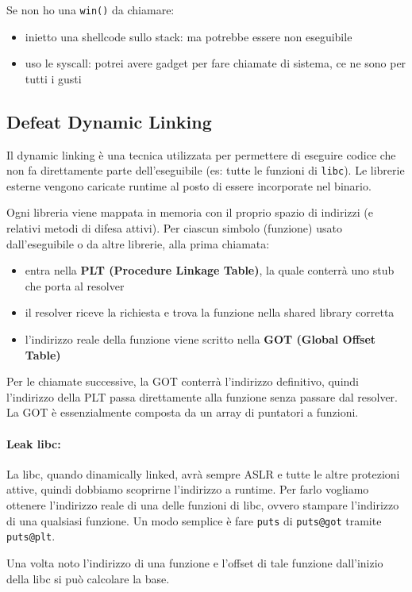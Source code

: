 Se non ho una \texttt{win()} da chiamare:
\begin{itemize}
	\item inietto una shellcode sullo stack: ma potrebbe essere non eseguibile

	\item uso le syscall: potrei avere gadget per fare chiamate di sistema, ce ne sono per tutti i gusti
\end{itemize}

\subsection{Defeat Dynamic Linking}

Il dynamic linking è una tecnica utilizzata per permettere di eseguire codice che non fa direttamente parte dell'eseguibile (es: tutte le funzioni di \texttt{libc}). Le librerie esterne vengono caricate runtime al posto di essere incorporate nel binario.

Ogni libreria viene mappata in memoria con il proprio spazio di indirizzi (e relativi metodi di difesa attivi). Per ciascun simbolo (funzione) usato dall'eseguibile o da altre librerie, alla prima chiamata:
\begin{itemize}
	\item entra nella \textbf{PLT (Procedure Linkage Table)}, la quale conterrà uno stub che porta al resolver
	
    \item il resolver riceve la richiesta e trova la funzione nella shared library corretta
	
    \item l'indirizzo reale della funzione viene scritto nella \textbf{GOT (Global Offset Table)}
\end{itemize}

Per le chiamate successive, la GOT conterrà l'indirizzo definitivo, quindi l'indirizzo della PLT passa direttamente alla funzione senza passare dal resolver. La GOT è essenzialmente composta da un array di puntatori a funzioni.

\paragraph{Leak libc:} La libc, quando dinamically linked, avrà sempre ASLR e tutte le altre protezioni attive, quindi dobbiamo scoprirne l'indirizzo a runtime. Per farlo vogliamo ottenere l'indirizzo reale di una delle funzioni di libc, ovvero stampare l'indirizzo di una qualsiasi funzione. Un modo semplice è fare \texttt{puts} di \texttt{puts@got} tramite \texttt{puts@plt}.

Una volta noto l'indirizzo di una funzione e l'offset di tale funzione dall'inizio della libc si può calcolare la base.